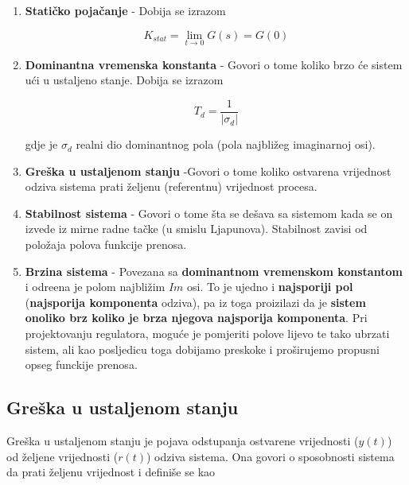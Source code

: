 \documentclass[12pt]{IEEEtran}
\numberwithin{equation}{subsection}
\numberwithin{figure}{section}
\begin{document}
\begin{enumerate}
    \item \textbf{Stati\v{c}ko poja\v{c}anje} - Dobija se izrazom

          \begin{equation}
              K_{stat} = \lim_{t \to 0}G(s) = G(0)
          \end{equation}

    \item \textbf{Dominantna vremenska konstanta} - Govori o tome koliko brzo
          \'{c}e sistem u\'{c}i u ustaljeno stanje. Dobija se izrazom

          \begin{equation}
              T_{d} = \frac{1}{|\sigma_{d}|}
          \end{equation}

          gdje je $\sigma_{d}$ realni dio dominantnog pola (pola najbli\v{z}eg imaginarnoj osi).

    \item \textbf{Gre\v{s}ka u ustaljenom stanju} -Govori o tome koliko
          ostvarena vrijednost odziva sistema prati \v{z}eljenu (referentnu) vrijednost procesa.

    \item \textbf{Stabilnost sistema} - Govori o tome \v{s}ta se de\v{s}ava sa sistemom
          kada se on izvede iz mirne radne ta\v{c}ke (u smislu Ljapunova). Stabilnost zavisi od 
          polo\v{z}aja polova funkcije prenosa.

    \item \textbf{Brzina sistema} - Povezana sa \textbf{dominantnom vremenskom konstantom} i 
    odre\dj{}ena je polom najbli\v{z}im $Im$ osi. To je ujedno i \textbf{najsporiji pol} (\textbf{najsporija komponenta} odziva),
    pa iz toga proizilazi da je \textbf{sistem onoliko brz koliko je brza njegova najsporija komponenta}.
    Pri projektovanju regulatora, mogu\'{c}e je pomjeriti polove lijevo te tako ubrzati sistem, 
    ali kao posljedicu toga dobijamo preskoke i pro\v{s}irujemo propusni opseg funckije prenosa.

\end{enumerate}

\subsection{\textbf{Gre\v{s}ka u ustaljenom stanju}}

Gre\v{s}ka u ustaljenom stanju je pojava odstupanja ostvarene vrijednosti ($y(t)$) od \v{z}eljene vrijednosti ($r(t)$)
odziva sistema. Ona govori o sposobnosti sistema da prati \v{z}eljenu vrijednost
i defini\v{s}e se kao
\end{document}
